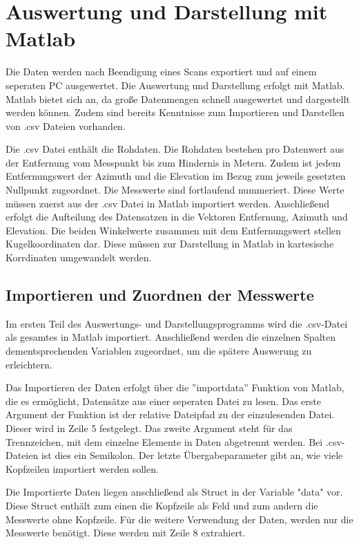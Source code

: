 

\chapter{Auswertung und Darstellung mit Matlab}\label{chap:auswertung_matlab}

Die Daten werden nach Beendigung eines Scans exportiert und auf einem seperaten PC ausgewertet. Die Auswertung und Darstellung erfolgt mit Matlab. Matlab bietet sich an, da große Datenmengen schnell ausgewertet und dargestellt werden können. Zudem sind bereits Kenntnisse zum Importieren und Darstellen von .csv Dateien vorhanden. 

Die .csv Datei enthält die Rohdaten. Die Rohdaten bestehen pro Datenwert aus der Entfernung vom Messpunkt bis zum Hindernis in Metern. Zudem ist jedem Entfernungswert der Azimuth und die Elevation im Bezug zum jeweils gesetzten Nullpunkt zugeordnet. Die Messwerte sind fortlaufend nummeriert. 
Diese Werte müssen zuerst aus der .csv Datei in Matlab importiert werden. Anschließend erfolgt die Aufteilung des Datensatzen in die Vektoren Entfernung, Azimuth und Elevation.
Die beiden Winkelwerte zusammen mit dem Entfernungswert stellen Kugelkoordinaten dar. Diese müssen zur Darstellung in Matlab in kartesische Korrdinaten umgewandelt werden. 



\section{Importieren und Zuordnen der Messwerte}

Im ersten Teil des Auswertungs- und Darstellungsprogramms wird die .csv-Datei als gesamtes in Matlab importiert. Anschließend werden die einzelnen Spalten dementsprechenden Variablen zugeordnet, um die spätere Auswerung zu erleichtern.

Das Importieren der Daten erfolgt über die ''importdata'' Funktion von Matlab, die es ermöglicht, Datensätze aus einer seperaten Datei zu lesen. Das erste Argument der Funktion ist der relative Dateipfad zu der einzulesenden Datei. Dieser wird in Zeile 5 festgelegt. Das zweite Argument steht für das Trennzeichen, mit dem einzelne Elemente in Daten abgetrennt werden. Bei .csv-Dateien ist dies ein Semikolon. Der letzte Übergabeparameter gibt an, wie viele Kopfzeilen importiert werden sollen.

Die Importierte Daten liegen anschließend als Struct in der Variable "data" vor. Diese Struct enthält zum einen die Kopfzeile als Feld und zum andern die Messwerte ohne Kopfzeile. Für die weitere Verwendung der Daten, werden nur die Messwerte benötigt. Diese werden mit Zeile 8 extrahiert. 

